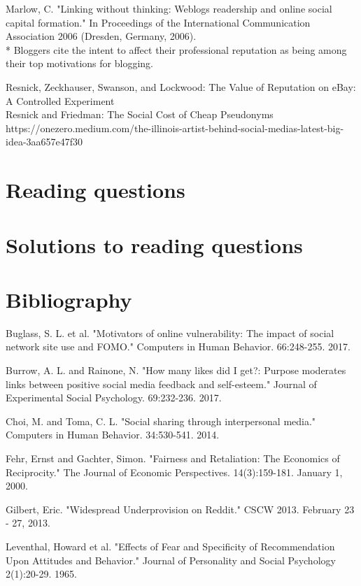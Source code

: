 \documentclass[class=book, crop=false]{standalone}
\begin{document}
Marlow, C. "Linking without thinking: Weblogs readership and online social capital formation." In Proceedings of the International Communication Association 2006 (Dresden, Germany, 2006).\\
 * Bloggers cite the intent to affect their professional reputation as being among their top motivations for blogging.

Resnick, Zeckhauser, Swanson, and Lockwood: The Value of Reputation on eBay: A Controlled Experiment\\

Resnick and Friedman: The Social Cost of Cheap Pseudonyms\\

https://onezero.medium.com/the-illinois-artist-behind-social-medias-latest-big-idea-3aa657e47f30

\section{Reading questions}

\section{Solutions to reading questions}

\section{Bibliography}

Buglass, S. L. et al. "Motivators of online vulnerability: The impact of social network site use and FOMO." Computers in Human Behavior. 66:248-255. 2017.

Burrow, A. L. and Rainone, N. "How many likes did I get?: Purpose moderates links between positive social media feedback and self-esteem." Journal of Experimental Social Psychology. 69:232-236. 2017.

Choi, M. and Toma, C. L. "Social sharing through interpersonal media." Computers in Human Behavior. 34:530-541. 2014.

Fehr, Ernst and Gachter, Simon. "Fairness and Retaliation: The Economics of Reciprocity." The Journal of Economic Perspectives. 14(3):159-181. January 1, 2000.

Gilbert, Eric. "Widespread Underprovision on Reddit." CSCW 2013. February 23 - 27, 2013.

Leventhal, Howard et al. "Effects of Fear and Specificity of Recommendation Upon Attitudes and Behavior." Journal of Personality and Social Psychology 2(1):20-29. 1965.
\end{document}
